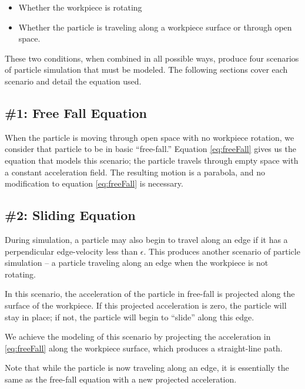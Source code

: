 \begin{itemize}
	\item Whether the workpiece is rotating
	\item Whether the particle is traveling along a workpiece surface or through open space.
\end{itemize}

These two conditions, when combined in all possible ways, produce four scenarios of particle simulation that must be modeled. The following sections cover each scenario and detail the equation used.

		\subsection{\#1: Free Fall Equation}

When the particle is moving through open space with no workpiece rotation, we consider that particle to be in basic ``free-fall.'' Equation \eqref{eq:freeFall} gives us the equation that models this scenario; the particle travels through empty space with a constant acceleration field. The resulting motion is a parabola, and no modification to equation \eqref{eq:freeFall} is necessary.


		\subsection{\#2: Sliding Equation}

During simulation, a particle may also begin to travel along an edge if it has a perpendicular edge-velocity less than $\epsilon$. This produces another scenario of particle simulation -- a particle traveling along an edge when the workpiece is not rotating.

In this scenario, the acceleration of the particle in free-fall is projected along the surface of the workpiece. If this projected acceleration is zero, the particle will stay in place; if not, the particle will begin to ``slide'' along this edge.

We achieve the modeling of this scenario by projecting the acceleration in \eqref{eq:freeFall} along the workpiece surface, which produces a straight-line path.

Note that while the particle is now traveling along an edge, it is essentially the same as the free-fall equation with a new projected acceleration.

